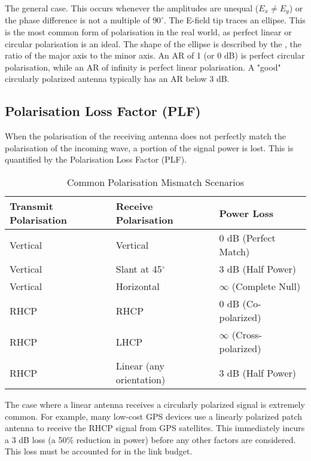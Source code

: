  The general case. This occurs whenever the amplitudes are unequal ($E_x \neq E_y$) or the phase difference is not a multiple of $90^\circ$.
 The E-field tip traces an ellipse. This is the most common form of polarisation in the real world, as perfect linear or circular polarisation is an ideal.
 The shape of the ellipse is described by the , the ratio of the major axis to the minor axis. An AR of 1 (or 0 dB) is perfect circular polarisation, while an AR of infinity is perfect linear polarisation. A "good" circularly polarized antenna typically has an AR below 3 dB.


\subsection{Polarisation Loss Factor (PLF)}

When the polarisation of the receiving antenna does not perfectly match the polarisation of the incoming wave, a portion of the signal power is lost. This is quantified by the Polarisation Loss Factor (PLF).

\begin{table}[H]
    \centering
    \caption{Common Polarisation Mismatch Scenarios}
    \label{tab:plf-summary}
    \begin{tabular}{@{}lll@{}}
        \toprule
        \tableheaderfont Transmit Polarisation & \tableheaderfont Receive Polarisation & \tableheaderfont Power Loss \\
        \midrule
        Vertical & Vertical & 0 dB (Perfect Match) \\
        Vertical & Slant at 45$^\circ$ & 3 dB (Half Power) \\
        Vertical & Horizontal & $\infty$ (Complete Null) \\
        \addlinespace
        RHCP & RHCP & 0 dB (Co-polarized) \\
        RHCP & LHCP & $\infty$ (Cross-polarized) \\
        \addlinespace
        RHCP & Linear (any orientation) & 3 dB (Half Power) \\
        \bottomrule
    \end{tabular}
\end{table}

\begin{importantbox}[title={The Critical 3 dB Loss}]
    The case where a linear antenna receives a circularly polarized signal is extremely common. For example, many low-cost GPS devices use a linearly polarized patch antenna to receive the RHCP signal from GPS satellites. This immediately incurs a 3 dB loss (a 50\% reduction in power) before any other factors are considered. This loss must be accounted for in the link budget.
\end{importantbox}


